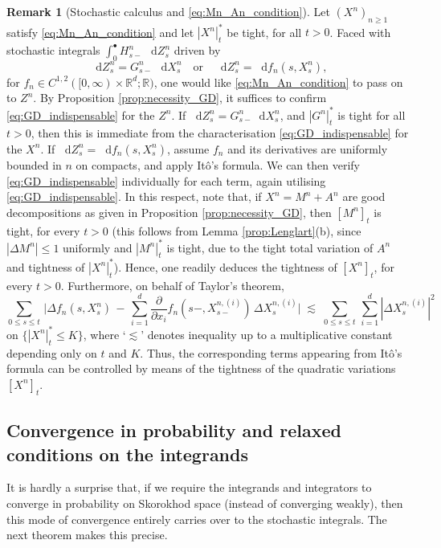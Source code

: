 \documentclass[11pt]{article}
\theoremstyle{definition}\newtheorem{example}[theorem]{Example}
\theoremstyle{definition}\newtheorem{counterexample}[theorem]{Counterexample}
\theoremstyle{definition}\newtheorem{remark}[theorem]{Remark}
\theoremstyle{definition}\newtheorem{defi}[theorem]{Definition}
\numberwithin{equation}{section}
\newcommand*\diff{\mathop{}\!\mathrm{d}}								%
\renewcommand{\|}{\; : \, \;}											%
\begin{document}
\begin{remark}[Stochastic calculus and \eqref{eq:Mn_An_condition}]\label{eq:integrals_Ito_GD} 
	Let $(X^n)_{n\ge 1}$ satisfy \eqref{eq:Mn_An_condition} and let $|X^n|^*_t$ be tight, for all $t>0$. Faced with stochastic integrals $\int_0^\bullet H^n_{s-} \,\diff Z^n_s$ driven by
	\[
	\diff Z^n_s=G^n_{s-} \,\diff X^n_s\quad \text{or} \quad \diff Z^n_s=\diff f_n(s,X^n_s),
	\]
	for $f_n\in C^{1,2}([0,\infty)\times\mathbb{R}^d;\mathbb{R})$, one would like \eqref{eq:Mn_An_condition} to pass on to $Z^n$. By Proposition \ref{prop:necessity_GD}, it suffices to confirm \eqref{eq:GD_indispensable} for the $Z^n$. If $\diff Z^n_s=G^n_{s-}\diff X^n_s$, and
	$|G^n|_t^*$ is tight for all $t>0$, then this is immediate from the characterisation \eqref{eq:GD_indispensable} for the $X^n$. If $\diff Z^n_s=\diff f_n(s,X^n_s)$, assume $f_n$ and its derivatives are uniformly bounded in $n$ on compacts, and apply Itô's formula. We can then verify \eqref{eq:GD_indispensable} individually for each term, again utilising \eqref{eq:GD_indispensable}. In this respect, note that, if $X^n=M^n+A^n$ are good decompositions as given in Proposition \ref{prop:necessity_GD}, then $[M^n]_t$ is tight, for every $t>0$ (this follows from Lemma \ref{prop:Lenglart}(b), since $|\Delta M^n|\le 1$ uniformly and $|M^n|^*_t$ is tight, due to the tight total variation of $A^n$ and tightness of $|X^n|_t^*$). Hence, one readily deduces the tightness of $[X^n]_t$, for every $t>0$. Furthermore, on behalf of Taylor's theorem,
	$$ \sum_{0\le s \le t} \, \Big| \Delta f_n(s,X^n_s) \, - \, \sum_{i=1}^d \frac{\partial}{\partial x_i} f_n(s- ,X^{n,(i)}_{s-}) \, \Delta X^{n,(i)}_{s}\Big| \; \lesssim \; \sum_{0\le s \le t} \, \sum_{i=1}^d |\Delta X^{n,(i)}_{s}|^2 $$
	on $\{|X^n|^*_t \le K\}$, where `$\lesssim$' denotes inequality up to a multiplicative constant depending only on $t$ and $K$. Thus, the corresponding terms appearing from Itô's formula can be controlled by means of the tightness of the quadratic variations $[X^n]_t$. 
\end{remark}




\subsection{Convergence in probability and relaxed conditions on the integrands}\label{subsect:probability_and_intregrands}
It is hardly a surprise that, if we require the integrands and integrators to converge in probability on Skorokhod space (instead of converging weakly), then this mode of convergence entirely carries over to the stochastic integrals. The next theorem makes this precise.
\end{document}

